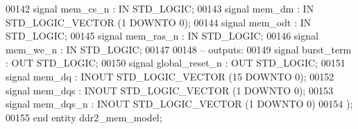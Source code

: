 \begin{DoxyCode}
00142                  \textcolor{keywordflow}{signal} \textcolor{vhdlchar}{mem_cs_n} \textcolor{vhdlchar}{:} \textcolor{keywordflow}{IN} \textcolor{comment}{STD\_LOGIC};
00143                  \textcolor{keywordflow}{signal} \textcolor{vhdlchar}{mem_dm} \textcolor{vhdlchar}{:} \textcolor{keywordflow}{IN} \textcolor{comment}{STD\_LOGIC\_VECTOR} \textcolor{vhdlchar}{(}\textcolor{vhdllogic}{}\textcolor{vhdllogic}{1} \textcolor{keywordflow}{DOWNTO} \textcolor{vhdllogic}{}\textcolor{vhdllogic}{0}\textcolor{vhdlchar}{)};
00144                  \textcolor{keywordflow}{signal} \textcolor{vhdlchar}{mem_odt} \textcolor{vhdlchar}{:} \textcolor{keywordflow}{IN} \textcolor{comment}{STD\_LOGIC};
00145                  \textcolor{keywordflow}{signal} \textcolor{vhdlchar}{mem_ras_n} \textcolor{vhdlchar}{:} \textcolor{keywordflow}{IN} \textcolor{comment}{STD\_LOGIC};
00146                  \textcolor{keywordflow}{signal} \textcolor{vhdlchar}{mem_we_n} \textcolor{vhdlchar}{:} \textcolor{keywordflow}{IN} \textcolor{comment}{STD\_LOGIC};
00147 
00148 \textcolor{keyword}{              -- outputs:}
00149                  \textcolor{keywordflow}{signal} \textcolor{vhdlchar}{burst_term} \textcolor{vhdlchar}{:} \textcolor{keywordflow}{OUT} \textcolor{comment}{STD\_LOGIC};
00150                  \textcolor{keywordflow}{signal} \textcolor{vhdlchar}{global_reset_n} \textcolor{vhdlchar}{:} \textcolor{keywordflow}{OUT} \textcolor{comment}{STD\_LOGIC};
00151                  \textcolor{keywordflow}{signal} \textcolor{vhdlchar}{mem_dq} \textcolor{vhdlchar}{:} \textcolor{keywordflow}{INOUT} \textcolor{comment}{STD\_LOGIC\_VECTOR} \textcolor{vhdlchar}{(}\textcolor{vhdllogic}{}\textcolor{vhdllogic}{15} \textcolor{keywordflow}{DOWNTO} \textcolor{vhdllogic}{}\textcolor{vhdllogic}{0}\textcolor{vhdlchar}{)};
00152                  \textcolor{keywordflow}{signal} \textcolor{vhdlchar}{mem_dqs} \textcolor{vhdlchar}{:} \textcolor{keywordflow}{INOUT} \textcolor{comment}{STD\_LOGIC\_VECTOR} \textcolor{vhdlchar}{(}\textcolor{vhdllogic}{}\textcolor{vhdllogic}{1} \textcolor{keywordflow}{DOWNTO} \textcolor{vhdllogic}{}\textcolor{vhdllogic}{0}\textcolor{vhdlchar}{)};
00153                  \textcolor{keywordflow}{signal} \textcolor{vhdlchar}{mem_dqs_n} \textcolor{vhdlchar}{:} \textcolor{keywordflow}{INOUT} \textcolor{comment}{STD\_LOGIC\_VECTOR} \textcolor{vhdlchar}{(}\textcolor{vhdllogic}{}\textcolor{vhdllogic}{1} \textcolor{keywordflow}{DOWNTO} \textcolor{vhdllogic}{}\textcolor{vhdllogic}{0}\textcolor{vhdlchar}{)}
00154               \textcolor{vhdlchar}{)};
00155 \textcolor{keywordflow}{end} \textcolor{keywordflow}{entity} \textcolor{vhdlchar}{ddr2\_mem\_model};

\end{DoxyCode}
